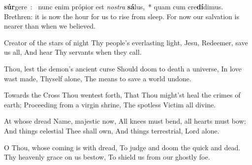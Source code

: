 {
\deusinadjutorium{}
\def\gabcfolder{../Advent1}
\bigskip
{\def\anttranslation{In that day the mountains shall drop down sweetness, and the hills shall flow with milk and honey, alleluia.}
\def\dontrepeatantiphon{T}
}
\bigskip
{\def\anttranslation{Shout for joy, O daughter of Sion, rejoice greatly, O daughter of Jerusalem, alleluia.}
}
\bigskip
{}
{\def\anttranslation{Behold, the Lord shall come, and all His Saints with Him: and there shall be in this day a great light, alleluia.}
}
\bigskip
{
\def\anttranslation{All ye that thirst come to the waters: seek the Lord while He can be found, alleluia.}
\def\dontrepeatantiphon{T}
}
\bigskip
{
\def\anttranslation{Behold there shall come the great Prophet, and He shall build Jerusalem anew, alleluia.\needspace{8\baselineskip}}
}
{}
\printchapter
{ \textbf{súr}\-ge\-re~:~\gredagger{} nunc enim própior est \emph{no\-stra} \textbf{sá}\-lus,~* quam cum cre\-\textbf{dí}\-dimus.}
{Brethren: it is now the hour for us to rise from sleep.  For now our salvation is nearer than when we believed.}
\bigskip
\label{hymn-creatoralmesiderum}
{
\def\gabcfolder{../Advent}
{\item Creator of the stars of night
Thy people's everlasting light,
Jesu, Redeemer, save us all,
And hear Thy servants when they call.

\item Thou, lest the demon's ancient curse
Should doom to death a universe,
In love wast made, Thyself alone,
The means to save a world undone.

\item Towards the Cross Thou wentest forth,
That Thou might'st heal the crimes of earth;
Proceeding from a virgin shrine,
The spotless Victim all divine.

\item At whose dread Name, majestic now,
All knees must bend, all hearts must bow;
And things celestial Thee shall own,
And things terrestrial, Lord alone.

\item O Thou, whose coming is with dread,
To judge and doom the quick and dead.
Thy heavenly grace on us bestow,
To shield us from our ghostly foe.

}}}
